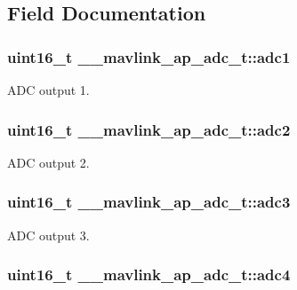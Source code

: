 \subsection{Field Documentation}
\hypertarget{struct____mavlink__ap__adc__t_a7085b5252a619e7c4598b5d9d5e7521e}{
\subsubsection[{adc1}]{\setlength{\rightskip}{0pt plus 5cm}uint16\+\_\+t \+\_\+\+\_\+mavlink\+\_\+ap\+\_\+adc\+\_\+t\+::adc1}}\label{struct____mavlink__ap__adc__t_a7085b5252a619e7c4598b5d9d5e7521e}


A\+D\+C output 1. 

\hypertarget{struct____mavlink__ap__adc__t_a1bfcd34e841173584870521ab6da574e}{
\subsubsection[{adc2}]{\setlength{\rightskip}{0pt plus 5cm}uint16\+\_\+t \+\_\+\+\_\+mavlink\+\_\+ap\+\_\+adc\+\_\+t\+::adc2}}\label{struct____mavlink__ap__adc__t_a1bfcd34e841173584870521ab6da574e}


A\+D\+C output 2. 

\hypertarget{struct____mavlink__ap__adc__t_a413706afd9ab7702fd4214d63b93bd77}{
\subsubsection[{adc3}]{\setlength{\rightskip}{0pt plus 5cm}uint16\+\_\+t \+\_\+\+\_\+mavlink\+\_\+ap\+\_\+adc\+\_\+t\+::adc3}}\label{struct____mavlink__ap__adc__t_a413706afd9ab7702fd4214d63b93bd77}


A\+D\+C output 3. 

\hypertarget{struct____mavlink__ap__adc__t_ab56ccc48681a678795f7a3b5eea44f34}{
\subsubsection[{adc4}]{\setlength{\rightskip}{0pt plus 5cm}uint16\+\_\+t \+\_\+\+\_\+mavlink\+\_\+ap\+\_\+adc\+\_\+t\+::adc4}}\label{struct____mavlink__ap__adc__t_ab56ccc48681a678795f7a3b5eea44f34}


